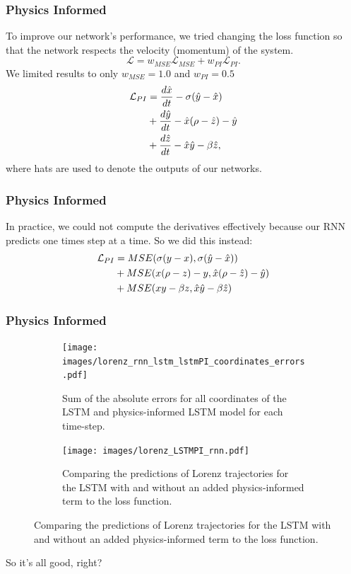 \documentclass{beamer}
\begin{document}
\begin{frame}[t]
	\frametitle{Physics Informed}
	To improve our network's performance, we tried changing the loss function so that the network respects the velocity (momentum) of the system.
	\[ \mathcal{L} = w_{MSE}\mathcal{L}_{MSE} + w_{PI}\mathcal{L}_{PI}. \] 
	We limited results to only $w_{MSE} = 1.0$ and $w_{PI}= 0.5$ 
	\begin{align}
    \mathcal{L}_{PI} &=     \frac{d \hat{x}}{dt} - \sigma (\hat{y}-\hat{x}) \notag\\
    & + \frac{d\hat{y}}{dt} - \hat{x}(\rho -\hat{z}) - \hat{y} \notag\\
    & +\frac{d\hat{z}}{dt} - \hat{x}\hat{y}- \beta \hat{z},
	\end{align}	
	where hats are used to denote the outputs of our networks.
\end{frame}
\begin{frame}[t]
	\frametitle{Physics Informed}
	In practice, we could not compute the derivatives effectively because our RNN predicts one times step at a time. So we did this instead:
	\begin{align}
	    \mathcal{L}_{PI} &=    MSE(\sigma (y-x), \sigma (\hat{y}-\hat{x})) \notag \\
	    & + MSE(x(\rho -z) - y , \hat{x}(\rho -\hat{z}) - \hat{y}) \notag \\
	    & +MSE(xy- \beta z , \hat{x}\hat{y}- \beta \hat{z})
	\end{align}
\end{frame}
\begin{frame}[t]
	\frametitle{Physics Informed}

	\begin{figure}[ht]
		\centering
		\begin{subfigure}[b]{0.5\textwidth}
		\begin{center}
			\texttt{[image: images/lorenz\_rnn\_lstm\_lstmPI\_coordinates\_errors.pdf]}
		\end{center}
		\caption{Sum of the absolute errors for all coordinates of the LSTM and physics-informed LSTM model for each time-step.}
		\end{subfigure}
		\begin{subfigure}[b]{0.45\textwidth}
		      \centering
		      \texttt{[image: images/lorenz\_LSTMPI\_rnn.pdf]}

		      \caption{Comparing the predictions of Lorenz trajectories for the LSTM with and without an added physics-informed term to the loss function.}
		      \label{fig:rnn-pi}
	    \end{subfigure}

		\label{fig:PI}
	\end{figure}
So it's all good, right?
\end{frame}
\end{document}

